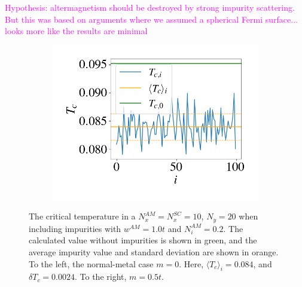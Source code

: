 \documentclass[aps,twocolumn,amsmath,amssymb,preprintnumbers,floatfix,prl,superscriptaddress,longbibliography]{revtex4-2}%
\newcommand{\hans}[1]{\textcolor{Magenta}{{#1}}}
\begin{document}
\hans{Hypothesis: altermagnetism should be destroyed by strong impurity scattering. But this was based on arguments where we assumed a spherical Fermi surface...}
\hans{looks more like the results are minimal}
\begin{figure}[htb]
    \centering
    \begin{subfigure}{0.6 \linewidth}
        \includegraphics[width = \linewidth]{plots_maintext/imps1.png}
    \end{subfigure}
    \caption{The critical temperature in a $N_x^{AM} = N_x^{SC}=10$, $N_y=20$ when including impurities with $w^{AM} = 1.0t$ and $N_{i}^{AM} =0.2$. The calculated value without impurities is shown in green, and the average impurity value and standard deviation are shown in orange. To the left, the normal-metal case $m=0$. Here, $\langle T_c \rangle_{i} = 0.084$, and $\delta T_c = 0.0024$. To the right, $m = 0.5t$. }
    \label{fig:imps}
\end{figure}
\end{document}
